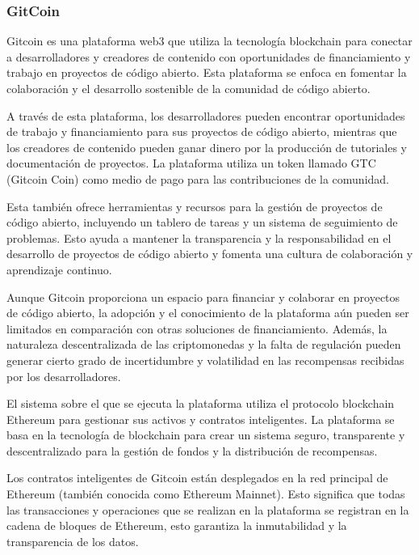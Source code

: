 \newpage

\subsubsection{GitCoin}

Gitcoin\cite{qayum2020self} es una plataforma web3 que utiliza la tecnología blockchain para conectar a desarrolladores y creadores de contenido con oportunidades de financiamiento y trabajo en proyectos de código abierto. Esta plataforma se enfoca en fomentar la colaboración y el desarrollo sostenible de la comunidad de código abierto.

\bigskip

A través de esta plataforma, los desarrolladores pueden encontrar oportunidades de trabajo y financiamiento para sus proyectos de código abierto, mientras que los creadores de contenido pueden ganar dinero por la producción de tutoriales y documentación de proyectos. La plataforma utiliza un token llamado GTC (Gitcoin Coin) como medio de pago para las contribuciones de la comunidad.

\bigskip

Esta también ofrece herramientas y recursos para la gestión de proyectos de código abierto, incluyendo un tablero de tareas y un sistema de seguimiento de problemas. Esto ayuda a mantener la transparencia y la responsabilidad en el desarrollo de proyectos de código abierto y fomenta una cultura de colaboración y aprendizaje continuo.

\bigskip

Aunque Gitcoin proporciona un espacio para financiar y colaborar en proyectos de código abierto, la adopción y el conocimiento de la plataforma aún pueden ser limitados en comparación con otras soluciones de financiamiento. Además, la naturaleza descentralizada de las criptomonedas y la falta de regulación pueden generar cierto grado de incertidumbre y volatilidad en las recompensas recibidas por los desarrolladores.

\bigskip

El sistema sobre el que se ejecuta la plataforma utiliza el protocolo blockchain Ethereum para gestionar sus activos y contratos inteligentes. La plataforma se basa en la tecnología de blockchain para crear un sistema seguro, transparente y descentralizado para la gestión de fondos y la distribución de recompensas.

\bigskip

Los contratos inteligentes de Gitcoin están desplegados en la red principal de Ethereum (también conocida como Ethereum Mainnet). Esto significa que todas las transacciones y operaciones que se realizan en la plataforma se registran en la cadena de bloques de Ethereum, esto garantiza la inmutabilidad y la transparencia de los datos.


